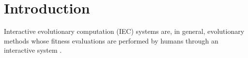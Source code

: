 \section{Introduction}




Interactive evolutionary computation (IEC) systems are, in general, evolutionary methods
whose fitness evaluations are performed by humans through an interactive 
system \cite{eiben2015interactive}.

